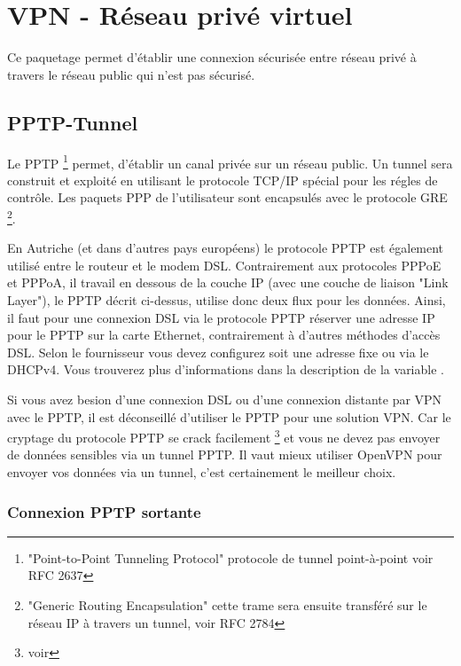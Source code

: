 
\section{VPN - Réseau privé virtuel}

Ce paquetage permet d'établir une connexion sécurisée entre réseau privé à
travers le réseau public qui n'est pas sécurisé.

\subsection{PPTP-Tunnel}

Le PPTP \footnote{"Point-to-Point Tunneling Protocol" protocole de tunnel
point-à-point voir RFC 2637} permet, d'établir un canal privée sur un réseau
public. Un tunnel sera construit et exploité en utilisant le protocole TCP/IP
spécial pour les régles de contrôle. Les paquets PPP de l'utilisateur sont
encapsulés avec le protocole GRE \footnote{"Generic Routing Encapsulation"
cette trame sera ensuite transféré sur le réseau IP à travers un tunnel,
voir RFC 2784}.

En Autriche (et dans d'autres pays européens) le protocole PPTP est également
utilisé entre le routeur et le modem DSL. Contrairement aux protocoles PPPoE
et PPPoA, il travail en dessous de la couche IP (avec une couche de liaison
"Link Layer"), le PPTP décrit ci-dessus, utilise donc deux flux pour les données.
Ainsi, il faut pour une connexion DSL via le protocole PPTP réserver une adresse IP
pour le PPTP sur la carte Ethernet, contrairement à d'autres méthodes d'accès
DSL. Selon le fournisseur vous devez configurez soit une adresse fixe ou via le
DHCPv4. Vous trouverez plus d'informations dans la description de la variable
.

Si vous avez besion d'une connexion DSL ou d'une connexion distante par VPN
avec le PPTP, il est déconseillé d'utiliser le PPTP pour une solution VPN.
Car le cryptage du protocole PPTP se crack facilement 
\footnote{voir } et vous ne devez pas envoyer
de données sensibles via un tunnel PPTP. Il vaut mieux utiliser OpenVPN pour
envoyer vos données via un tunnel, c'est certainement le meilleur choix.

\subsubsection{Connexion PPTP sortante}

